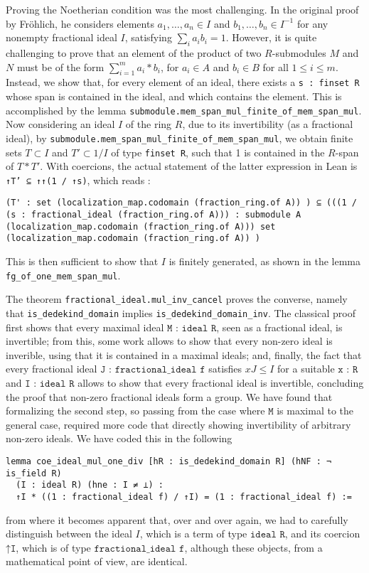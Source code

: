 \documentclass[a4paper,USenglish,cleveref, autoref, thm-restate]{lipics-v2021}
\newcommand{\lean}[1]{\texttt{#1}\xspace} %
\begin{document}
Proving the Noetherian condition was the most challenging. In the original proof by Fr\"ohlich, he considers elements $a_1, \dots, a_n \in I$ and $b_1, \dots, b_n \in I^{-1}$ for any nonempty fractional ideal $I$,
satisfying $ \sum_i a_i b_i = 1 $.
However, it is quite challenging to prove that an element of the product of two $R$-submodules $M$ and $N$ must be of the form $\sum_{i = 1}^m a_i*b_i$, for $a_i \in A$ and $b_i \in B$ for all $1 \leq i \leq m$.
Instead, we show that, for every element of an ideal, there exists a \lean{s : finset R} whose span is contained in the ideal, and which contains the element.
This is accomplished by the lemma \lean{submodule.mem\_span\_mul\_finite\_of\_mem\_span\_mul}.
Now considering an ideal $I$ of the ring $R$, due to its invertibility (as a fractional ideal), by \lean{submodule.mem\_span\_mul\_finite\_of\_mem\_span\_mul}, we obtain finite sets $T \subset I$ and $T' \subset 1/I$ of type \lean{finset R}, such that 1 is contained in the $R$-span of $T*T'$. With coercions, the actual statement of the latter expression in Lean is \lean{↑T' ⊆ ↑↑(1 / ↑s)}, which reads :

\begin{lstlisting}
(T' : set (localization_map.codomain (fraction_ring.of A)) ) ⊆ (((1 / (s : fractional_ideal (fraction_ring.of A))) : submodule A (localization_map.codomain (fraction_ring.of A))) set (localization_map.codomain (fraction_ring.of A)) )
\end{lstlisting}

This is then sufficient to show that $I$ is finitely generated, as shown in the lemma \lean{fg\_of\_one\_mem\_span\_mul}.

The theorem \lean{fractional\_ideal.mul\_inv\_cancel} proves the converse, namely that \lean{is\_dedekind\_domain} implies \lean{is\_dedekind\_domain\_inv}. The classical proof first shows that every maximal ideal $\lean{M : ideal R}$, seen as a fractional ideal, is invertible; from this, some work allows to show that every non-zero ideal is inverible, using that it is contained in a maximal ideals; and, finally, the fact that every fractional ideal $\lean{J : fractional\_ideal f}$ satisfies $xJ\leq I$ for a suitable $\lean{x : R}$ and $\lean{I : ideal R}$ allows to show that every fractional ideal is invertible, concluding the proof that non-zero fractional ideals form a group. We have found that formalizing the second step, so passing from the case where $\lean{M}$ is maximal to the general case, required more code that directly showing invertibility of arbitrary non-zero ideals. We have coded this in the following
\begin{lstlisting}
lemma coe_ideal_mul_one_div [hR : is_dedekind_domain R] (hNF : ¬ is_field R)
  (I : ideal R) (hne : I ≠ ⊥) :
  ↑I * ((1 : fractional_ideal f) / ↑I) = (1 : fractional_ideal f) :=
\end{lstlisting}
from where it becomes apparent that, over and over again, we had to carefully distinguish between the ideal $I$, which is a term of type $\lean{ideal R}$, and its coercion $\lean{↑I}$, which is of type $\lean{fractional\_ideal f}$, although these objects, from a mathematical point of view, are identical.
\end{document}
